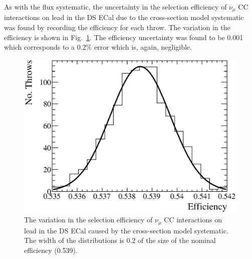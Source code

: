 \newline
\newline
As with the flux systematic, the uncertainty in the selection efficiency of $\nu_\mu$ CC interactions on lead in the DS ECal due to the cross-section model systematic was found by recording the efficiency for each throw.  The variation in the efficiency is shown in Fig.~\ref{fig:XSecEfficiencyVariation}.  The efficiency uncertainty was found to be 0.001 which corresponds to a 0.2$\%$ error which is, again, negligible.
\begin{figure}[t!]
  \centering
  \includegraphics[width=12cm]{images/measurement/systematics/xsec/xsec_efficiency_variation.eps}
  \caption{The variation in the selection efficiency of $\nu_\mu$ CC interactions on lead in the DS ECal caused by the cross-section model systematic.  The width of the distributions is $0.2$ of the size of the nominal efficiency (0.539).}
  \label{fig:XSecEfficiencyVariation}
\end{figure}
\newline
\newline
